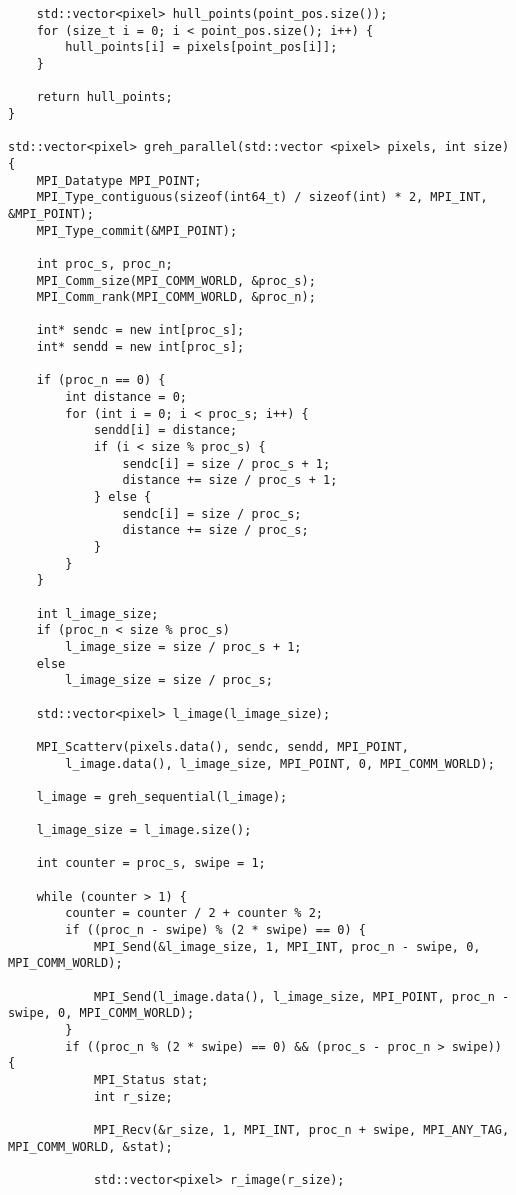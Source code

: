 \documentclass{report}
\begin{document}
\begin{lstlisting}
    std::vector<pixel> hull_points(point_pos.size());
    for (size_t i = 0; i < point_pos.size(); i++) {
        hull_points[i] = pixels[point_pos[i]];
    }

    return hull_points;
}

std::vector<pixel> greh_parallel(std::vector <pixel> pixels, int size) {
    MPI_Datatype MPI_POINT;
    MPI_Type_contiguous(sizeof(int64_t) / sizeof(int) * 2, MPI_INT, &MPI_POINT);
    MPI_Type_commit(&MPI_POINT);

    int proc_s, proc_n;
    MPI_Comm_size(MPI_COMM_WORLD, &proc_s);
    MPI_Comm_rank(MPI_COMM_WORLD, &proc_n);

    int* sendc = new int[proc_s];
    int* sendd = new int[proc_s];

    if (proc_n == 0) {
        int distance = 0;
        for (int i = 0; i < proc_s; i++) {
            sendd[i] = distance;
            if (i < size % proc_s) {
                sendc[i] = size / proc_s + 1;
                distance += size / proc_s + 1;
            } else {
                sendc[i] = size / proc_s;
                distance += size / proc_s;
            }
        }
    }

    int l_image_size;
    if (proc_n < size % proc_s)
        l_image_size = size / proc_s + 1;
    else
        l_image_size = size / proc_s;

    std::vector<pixel> l_image(l_image_size);

    MPI_Scatterv(pixels.data(), sendc, sendd, MPI_POINT,
        l_image.data(), l_image_size, MPI_POINT, 0, MPI_COMM_WORLD);

    l_image = greh_sequential(l_image);

    l_image_size = l_image.size();

    int counter = proc_s, swipe = 1;

    while (counter > 1) {
        counter = counter / 2 + counter % 2;
        if ((proc_n - swipe) % (2 * swipe) == 0) {
            MPI_Send(&l_image_size, 1, MPI_INT, proc_n - swipe, 0, MPI_COMM_WORLD);

            MPI_Send(l_image.data(), l_image_size, MPI_POINT, proc_n - swipe, 0, MPI_COMM_WORLD);
        }
        if ((proc_n % (2 * swipe) == 0) && (proc_s - proc_n > swipe)) {
            MPI_Status stat;
            int r_size;

            MPI_Recv(&r_size, 1, MPI_INT, proc_n + swipe, MPI_ANY_TAG, MPI_COMM_WORLD, &stat);

            std::vector<pixel> r_image(r_size);


\end{lstlisting}
\end{document}
